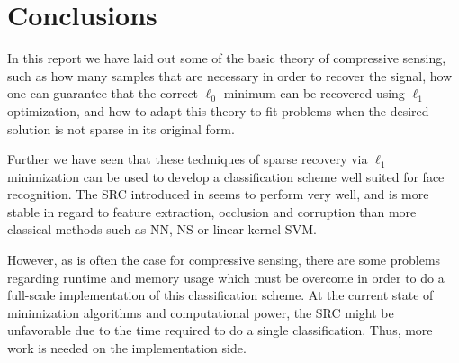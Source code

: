\chapter{Conclusions}
In this report we have laid out some of the basic theory of compressive sensing, such as how many samples that are necessary in order to recover the signal, how one can guarantee that the correct $ \ell_{0} $ minimum can be recovered using $ \ell_{1} $ optimization, and how to adapt this theory to fit problems when the desired solution is not sparse in its original form. 

Further we have seen that these techniques of sparse recovery via $ \ell_{1} $ minimization can be used to develop a classification scheme well suited for face recognition. The SRC introduced in \cite{wright09facerecog} seems to perform very well, and is more stable in regard to feature extraction, occlusion and corruption than more classical methods such as NN, NS or linear-kernel SVM. 

However, as is often the case for compressive sensing, there are some problems regarding runtime and memory usage which must be overcome in order to do a full-scale implementation of this classification scheme. At the current state of minimization algorithms and computational power, the SRC might be unfavorable due to the time required to do a single classification. Thus, more work is needed on the implementation side. 


